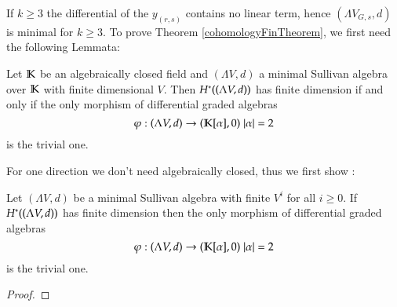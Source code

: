   If $k \geq 3$ the differential of the $y_{(r,s)}$ contains no linear term, hence
  $(\Lambda V_{G,s} ,d)$ is minimal for $k \geq 3$. To prove Theorem \ref{cohomologyFinTheorem}, we first need the following Lemmata:
 
 \begin{Lemma}
  Let $\mathbb{K}$ be an algebraically closed field and $(\Lambda V,d)$ a minimal Sullivan
  algebra over $\mathbb{K}$ with finite dimensional $V$. \newline
  Then $H^*((\Lambda V,d))$ has finite dimension if and only if   
  the only morphism of differential graded algebras 
  $$ \varphi : (\Lambda V,d) \to (\mathbb{K}[\alpha],0) \; |\alpha| = 2 $$ 
  is the trivial one.
 \end{Lemma}
 For one direction we don't need algebraically closed, thus we first show :
  \begin{Lemma}
   Let $(\Lambda V,d)$ be a minimal Sullivan algebra with finite $V^i$ for all $i \geq 0$. \newline
  If $H^*((\Lambda V,d))$ has finite dimension then
  the only morphism of differential graded algebras 
  $$ \varphi : (\Lambda V,d) \to (\mathbb{K}[\alpha],0) \; |\alpha| = 2 $$ 
  is the trivial one.
  \end{Lemma}

 \begin{proof}
%    
 \end{proof}

